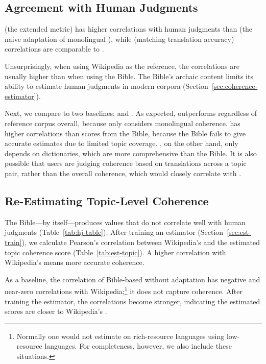 \subsection{Agreement with Human Judgments}

\cnpmi{} (the extended metric) has higher correlations with human
judgments than \inpmi{} (the naive adaptation of monolingual \npmi{}),
while \mta{} (matching translation accuracy) correlations are
comparable to \cnpmi{}.



Unsurprisingly, when using Wikipedia as the reference, the
correlations are usually higher than when using the Bible. The Bible's
archaic content limits its ability to estimate human judgments in
modern corpora (Section~\ref{sec:coherence-estimator}).

Next, we compare \cnpmi{} to two baselines: \inpmi{} and \mta{}. As
expected, \cnpmi{} outperforms \inpmi{} regardless of reference corpus
overall, because \inpmi{} only considers monolingual coherence. \mta{}
has higher correlations than \cnpmi{} scores from the Bible, because the
Bible fails to give accurate estimates due to limited topic
coverage. \mta{}, on the other hand, only depends on dictionaries,
which are more comprehensive than the Bible. It is also possible that 
users are judging coherence based on
translations across a topic pair, rather than the overall coherence,
which would closely correlate with \mta{}.






\subsection{Re-Estimating Topic-Level Coherence}
\label{sec:estimator}

The Bible---by itself---produces \cnpmi{} values that do not correlate
well with human judgments (Table~\ref{tab:hj-table}).  After
training an estimator (Section~\ref{sec:est-train}), we calculate 
Pearson's correlation between Wikipedia's \cnpmi{} and the estimated
topic coherence score (Table~\ref{tab:est-topic}).  A higher
correlation with Wikipedia's \cnpmi{} means more accurate coherence.

As a baseline, the correlation of Bible-based \cnpmi{} without
adaptation has negative and near-zero correlations with
Wikipedia;\footnote{Normally one would not estimate \cnpmi{} on
  rich-resource languages using low-resource languages. For
  completeness, however, we also include these situations.}  it does
not capture coherence.  After training the estimator, the correlations
become stronger, indicating the estimated scores are closer to
Wikipedia's \cnpmi{}.

